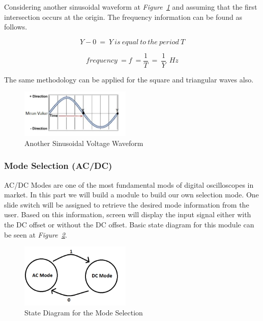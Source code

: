 \documentclass[paper]{IEEEtran}
\begin{document}
	Considering another sinusoidal waveform at \textit{Figure~\ref{fig:voltsin2}} and assuming that the first intersection occurs at the origin. The frequency information can be found as follows.
	
	$$	Y-0~=~Y~is~equal~to~the~period~T	$$
		
	$$	frequency~=f~=\frac{1}{T}~=~\frac{1}{Y}~~Hz	$$

	The same methodology can be applied for the square and triangular waves also.
	
\begin{figure}[h!]
	\setlength{\unitlength}{\textwidth}
	\center 
	\includegraphics[width=0.47\textwidth]{voltsin2}
	\caption{\label{fig:voltsin2} Another Sinusoidal Voltage Waveform\cite{b6}}
\end{figure}



\subsubsection{Mode Selection (AC/DC)} \- \indent

	AC/DC Modes are one of the most fundamental mods of digital oscilloscopes in market. In this part we will build a module to build our own selection mode. One slide switch will be assigned to retrieve the desired mode information from the user. Based on this information, screen will display the input signal either with the DC offset or without the DC offset. Basic state diagram for this module can be seen at \textit{Figure~\ref{fig:acdc}}.

\begin{figure}[h!]
	\setlength{\unitlength}{\textwidth}
	\center 
	\includegraphics[width=0.47\textwidth]{acdc}
	\caption{\label{fig:acdc} State Diagram for the Mode Selection}
\end{figure}
\end{document}
